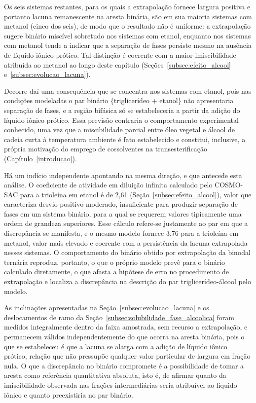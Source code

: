 Os seis sistemas restantes, para os quais a extrapolação fornece largura positiva e portanto lacuna remanescente na aresta binária, são em sua maioria sistemas com metanol (cinco dos seis), de modo que o resultado não é uniforme: a extrapolação sugere binário miscível sobretudo nos sistemas com etanol, enquanto nos sistemas com metanol tende a indicar que a separação de fases persiste mesmo na ausência de líquido iônico prótico. Tal distinção é coerente com a maior imiscibilidade atribuída ao metanol ao longo deste capítulo (Seções~\ref{subsec:efeito_alcool} e~\ref{subsec:evolucao_lacuna}).

Decorre daí uma consequência que se concentra nos sistemas com etanol, pois nas condições modeladas o par binário \{triglicerídeo + etanol\} não apresentaria separação de fases, e a região bifásica só se estabeleceria a partir da adição do líquido iônico prótico. Essa previsão contraria o comportamento experimental conhecido, uma vez que a miscibilidade parcial entre óleo vegetal e álcool de cadeia curta à temperatura ambiente é fato estabelecido e constitui, inclusive, a própria motivação do emprego de cossolventes na transesterificação (Capítulo~\ref{introducao}).

Há um indício independente apontando na mesma direção, e que antecede esta análise. O coeficiente de atividade em diluição infinita calculado pelo COSMO-SAC para a trioleína em etanol é de 2,61 (Seção~\ref{subsec:efeito_alcool}), valor que caracteriza desvio positivo moderado, insuficiente para produzir separação de fases em um sistema binário, para a qual se requerem valores tipicamente uma ordem de grandeza superiores. Esse cálculo refere-se justamente ao par em que a discrepância se manifesta, e o mesmo modelo fornece 3,76 para a trioleína em metanol, valor mais elevado e coerente com a persistência da lacuna extrapolada nesses sistemas. O comportamento do binário obtido por extrapolação da binodal ternária reproduz, portanto, o que o próprio modelo prevê para o binário calculado diretamente, o que afasta a hipótese de erro no procedimento de extrapolação e localiza a discrepância na descrição do par triglicerídeo-álcool pelo modelo.

As inclinações apresentadas na Seção~\ref{subsec:evolucao_lacuna} e os deslocamentos de ramo da Seção~\ref{subsec:solubilidade_fase_alcoolica} foram medidos integralmente dentro da faixa amostrada, sem recurso a extrapolação, e permanecem válidos independentemente do que ocorra na aresta binária, pois o que se estabeleceu é que a lacuna se alarga com a adição de líquido iônico prótico, relação que não pressupõe qualquer valor particular de largura em fração nula. O que a discrepância no binário compromete é a possibilidade de tomar a aresta como referência quantitativa absoluta, isto é, de afirmar quanto da imiscibilidade observada nas frações intermediárias seria atribuível ao líquido iônico e quanto preexistiria no par binário.

